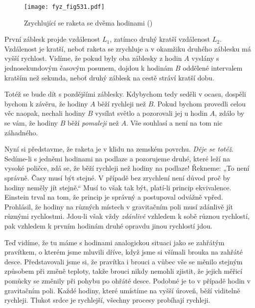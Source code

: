     \begin{figure}[ht!] %
      \centering
      \texttt{[image: fyz\_fig531.pdf]}
      \caption{Zrychlující se raketa se dvěma hodinami (\cite[s.~786]{Feynman02})}
      \label{fyz:fig531}
    \end{figure}
    
    První záblesk projde vzdálenost \(L_1\), zatímco druhý kratší vzdálenost \(L_2\). Vzdálenost je 
    kratší, neboť raketa se zrychluje a v okamžiku druhého záblesku má vyšší rychlost. Vidíme, že 
    pokud byly oba záblesky z hodin \(A\) vyslány s jednosekundovým časovým posunem, dojdou k 
    hodinám \(B\) oddělené intervalem kratším než sekunda, neboť druhý záblesk na cestě stráví 
    kratší dobu.
    
    Totéž se bude dít s pozdějšími záblesky. Kdybychom tedy seděli v ocasu, dospěli bychom k 
    závěru, že hodiny \(A\) běží rychleji než \(B\). Pokud bychom provedli celou věc naopak, 
    nechali hodiny \(B\) vysílat světlo a pozorovali jej u hodin \(A\), zdálo by se vám, že hodiny 
    \(B\) běží \emph{pomaleji} než \(A\). Vše souhlasí a není na tom nic záhadného.
    
    Nyní si představme, že raketa je v klidu na zemském povrchu. \emph{Děje se totéž}. Sedíme-li s 
    jedněmi hodinami na podlaze a pozorujeme druhé, které leží na vysoké poličce, zdá se, že běží 
    rychleji než hodiny na podlaze! Řekneme: „To není správně. Časy musí být stejné. V případě bez 
    zrychlení není důvod proč by hodiny neměly jít stejně.“ Musí to však tak být, platí-li princip 
    ekvivalence. Einstein trval na tom, že princip je správný a postupoval odvážně vpřed. 
    Prohlásil, že hodiny na různých místech v gravitačním poli musí zdánlivě jít různými 
    rychlostmi. Jdou-li však vždy \emph{zdánlivě} vzhledem k sobě různou rychlostí, pak vzhledem k 
    prvním hodinám druhé opravdu jinou rychlostí jdou.
    
    Teď vidíme, že tu máme s hodinami analogickou situaci jako se zahřátým pravítkem, o kterém jsme 
    mluvili dříve, když jsme si všímali brouka na zahřáté desce. Představovali jsme si, že pravítka 
    i brouci a vůbec vše se měnilo stejným způsobem při změně teploty, takže brouci nikdy nemohli 
    zjistit, že jejich měřicí pomůcky se změnily při pohybu po ohřáté desce. Podobné je to v 
    případě hodin v gravitačním poli. Každé hodiny, které umístíme na vyšší úroveň, běží viditelně 
    rychleji. Tlukot srdce je rychlejší, všechny procesy probíhají rychleji.

